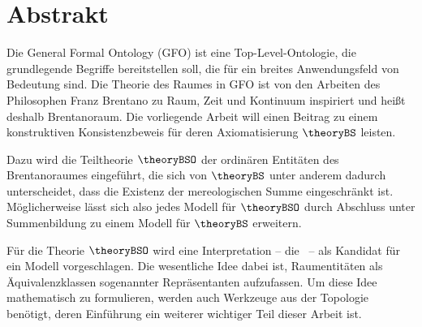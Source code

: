 \chapter*{Abstrakt}

Die General Formal Ontology (GFO) ist eine Top-Level-Ontologie, die grundlegende Begriffe bereitstellen soll, die für ein breites Anwendungsfeld von Bedeutung sind.
Die Theorie des Raumes in GFO ist von den Arbeiten des Philosophen Franz Brentano zu Raum, Zeit und Kontinuum inspiriert und heißt deshalb Brentanoraum.
Die vorliegende Arbeit will einen Beitrag zu einem konstruktiven Konsistenzbeweis für deren Axiomatisierung $\theoryBS$ leisten.

Dazu wird die Teiltheorie $\theoryBSO$ der ordinären Entitäten des Brentanoraumes eingeführt, die sich von $\theoryBS$ unter anderem dadurch unterscheidet, dass die Existenz der mereologischen Summe eingeschränkt ist.
Möglicherweise lässt sich also jedes Modell für $\theoryBSO$ durch Abschluss unter Summenbildung zu einem Modell für $\theoryBS$ erweitern.

Für die Theorie $\theoryBSO$ wird eine Interpretation -- die \strukt\ -- als Kandidat für ein Modell vorgeschlagen.
Die wesentliche Idee dabei ist, Raumentitäten als Äquivalenzklassen sogenannter Repräsentanten aufzufassen.
Um diese Idee mathematisch zu formulieren, werden auch Werkzeuge aus der Topologie benötigt, deren Einführung ein weiterer wichtiger Teil dieser Arbeit ist.

%
%     
%     








